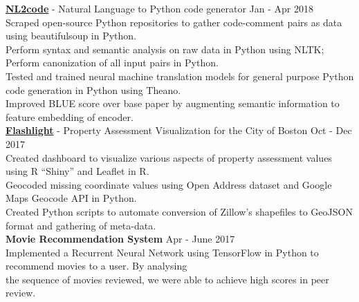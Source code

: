 \documentclass[a4paper]{article}
\newcommand{\myline}{\par
  \kern2pt %
  \hrule height 0.5pt
  \kern2pt %
}
\newcommand{\mybullet}{
	\indent \textbullet \hspace*{2mm}
}
\begin{document}
			\noindent
      \textbf{\href{https://github.com/DarkestFloyd/NL2code}{NL2code}} - Natural Language to 
      Python code generator \hfill Jan - Apr 2018 \\
      \mybullet Scraped open-source Python repositories to gather code-comment pairs as data 
      using beautifulsoup in Python. \\
      \mybullet Perform syntax and semantic analysis on raw data in Python using NLTK; Perform canonization of all input pairs in Python. \\
      \mybullet Tested and trained neural machine translation models for general purpose Python 
      code generation in Python using Theano. \\
      \mybullet Improved BLUE score over base paper by augmenting semantic information to 
      feature embedding of encoder. \\

			\noindent
      \textbf{\href{https://sichenghao1992.shinyapps.io/DS5110/}{Flashlight}} - Property 
			Assessment Visualization for the City of Boston \hfill Oct - Dec 2017 \\
      \mybullet Created dashboard to visualize various aspects of property assessment values 
      using R ``Shiny'' and Leaflet in R. \\
      \mybullet Geocoded missing coordinate values using Open Address dataset and Google Maps Geocode API in Python. \\
      \mybullet Created Python scripts to automate conversion of Zillow's shapefiles to GeoJSON format and gathering of meta-data. \\ 
			
			\noindent
			\textbf{Movie Recommendation System} \hfill Apr - June 2017\\
			\mybullet Implemented a Recurrent Neural Network using TensorFlow in Python to recommend 
      movies to a user. By analysing \\ \hspace*{9mm} the sequence of movies reviewed, we were 
      able to achieve high scores in peer review. \\ 

	
		
\end{document}
